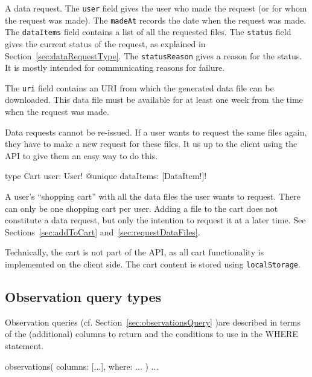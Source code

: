 A data request. The \verb|user| field gives the user who made the request (or for whom the request was made). The \verb|madeAt| records the date when the request was made. The \verb|dataItems| field contains a list of all the requested files. The \verb|status| field gives the current status of the request, as explained in Section~\ref{sec:dataRequestType}. The \verb|statusReason| gives a reason for the status. It is mostly intended for communicating reasons for failure.

The \verb|uri| field contains an URI from which the generated data file can be downloaded. This data file must be available for at least one week from the time when the request was made.

\begin{note}
Data requests cannot be re-issued. If a user wants to request the same files again, they have to make a new request for these files. It us up to the client using the API to give them an easy way to do this.
\end{note}


\begin{code}
type Cart {
  user: User! @unique
  dataItems: [DataItem!]!
}
\end{code}

A user's ``shopping cart'' with all the data files the user wants to request. There can only be one shopping cart per user. Adding a file to the cart does not constitute a data request, but only the intention to request it at a later time. See Sections~\ref{sec:addToCart} and~\ref{sec:requestDataFiles}.

\begin{note}
Technically, the cart is not part of the API, as all cart functionality is implememted on the client side. The cart content is stored using \verb|localStorage|.
\end{note}

\subsection{Observation query types}
\label{sec:observationQueryTypes}

Observation queries (cf. Section~\ref{sec:observationsQuery} )are described in terms of the (additional) columns to return and the conditions to use in the WHERE statement.

\begin{code}
observations(
  columns: [...],
  where: ...
) {
  ...
}
\end{code}

